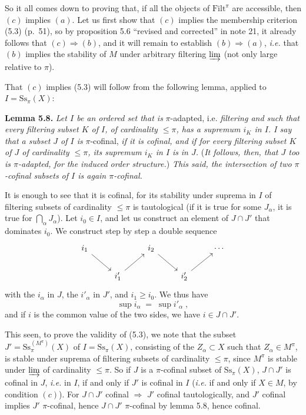 \documentclass[11pt]{article}
\newcommand{\printedpage}[1]{\marginpar{\footnotesize p.~#1}}
\newcommand{\msp}[1]{\marginpar{\footnotesize [#1]}}
\newcommand{\Filt}{\mathrm{Filt}}
\newcommand{\Ss}{\mathrm{Ss}}
\begin{document}
So it all comes down to proving that, if all the objects of $\Filt^\pi$ are accessible, then $(c)$ implies $(a)$. Let us first show that $(c)$ implies the membership criterion (5.3) (p.~51), so by proposition 5.6 ``revised and corrected'' in note 21, it already follows that $(c) \Longrightarrow (b)$, and it will remain to establish $(b) \Longrightarrow (a)$, \textit{i.e.} that $(b)$ implies the stability of $M$ under arbitrary filtering $\varinjlim$ (not only large relative to $\pi$).

That $(c)$ implies (5.3) will follow from the following lemma, applied to $I = \Ss_\pi(X)$:

\textbf{Lemma 5.8.} \textit{Let $I$ be an ordered set that is} $\pi$-adapted, i.e. \textit{filtering and such that every filtering subset $K$ of $I$, of cardinality $\leq \pi$, has a supremum $i_K$ in $I$. I say that a subset $J$ of $I$ is} $\pi$-cofinal, \textit{if it is cofinal, and if for every filtering subset $K$ of $J$ of cardinality $\leq \pi$, its supremum $i_K$ in $I$ is}
\printedpage{36}
\msp{page 60}
\textit{in $J$.} (\textit{It follows, then, that $J$ too is $\pi$-adapted, for the induced order structure.}) \textit{This said, the intersection of two $\pi$-cofinal subsets of $I$ is again $\pi$-cofinal.}

It is enough to see that it is cofinal, for its stability under suprema in $I$ of filtering subsets of cardinality $\leq \pi$ is tautological (if it is true for some $J_\alpha$, it is true for $\bigcap_\alpha J_\alpha$). Let $i_0 \in I$, and let us construct an element of $J \cap J'$ that dominates $i_0$. We construct step by step a double sequence
\[
\begin{tikzcd}
i_1 \arrow[dr] & & i_2 \arrow[dr] & & \cdots \\
& i'_1 \arrow[ur] & & i'_2 \arrow[ur] &
\end{tikzcd}
\]
with the $i_\alpha$ in $J$, the $i'_\alpha$ in $J'$, and $i_1 \geq i_0$. We thus have
\[
\sup i_\alpha \;=\; \sup i'_\alpha \;,
\]
and if $i$ is the common value of the two sides, we have $i \in J \cap J'$.

This seen, to prove the validity of (5.3), we note that the subset $J' = \Ss_\pi^{(M^\pi)}(X)$ of $I = \Ss_\pi(X)$, consisting of the $Z_\alpha \subset X$ such that $Z_\alpha \in M^\pi$, is stable under suprema of filtering subsets of cardinality $\leq \pi$, since $M^\pi$ is stable
\msp{page 61}
under $\varinjlim$ of cardinality $\leq \pi$. So if $J$ is a $\pi$-cofinal subset of $\Ss_\pi(X)$, $J \cap J'$ is cofinal in $J$, \textit{i.e.} in $I$, if and only if $J'$ is cofinal in $I$ (\textit{i.e.} if and only if $X \in M$, by condition $(c)$). For $J \cap J'$ cofinal $\Longrightarrow$ $J'$ cofinal tautologically, and $J'$ cofinal implies $J'$ $\pi$-cofinal, hence $J \cap J'$ $\pi$-cofinal by lemma 5.8, hence cofinal.
\end{document}
